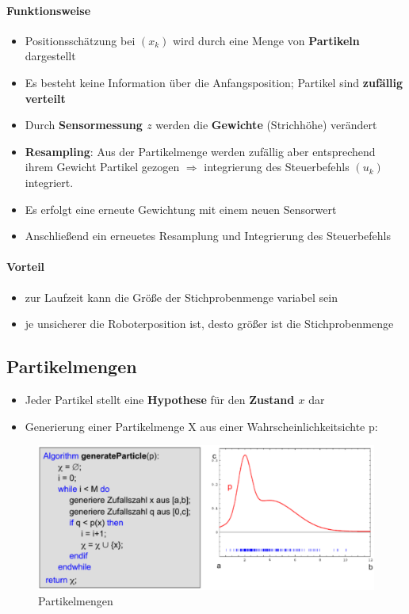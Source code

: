 \paragraph{Funktionsweise}
\begin{itemize}
	\item Positionsschätzung bei $(x_k)$ wird durch eine Menge von \textbf{Partikeln} dargestellt
	\item Es besteht keine Information über die Anfangsposition; Partikel sind \textbf{zufällig verteilt}
	\item Durch \textbf{Sensormessung $z$} werden die \textbf{Gewichte} (Strichhöhe) verändert
	\item \textbf{Resampling}: Aus der Partikelmenge werden zufällig aber entsprechend ihrem Gewicht Partikel gezogen $\Rightarrow$ integrierung des Steuerbefehls $(u_k)$ integriert.
	\item Es erfolgt eine erneute Gewichtung mit einem neuen Sensorwert
	\item Anschließend ein erneuetes Resamplung und Integrierung des Steuerbefehls
\end{itemize}
\paragraph{Vorteil}
\begin{itemize}
	\item zur Laufzeit kann die Größe der Stichprobenmenge variabel sein
	\item je unsicherer die Roboterposition ist, desto größer ist die Stichprobenmenge
\end{itemize}
\subsection{Partikelmengen}
\begin{itemize}
	\item Jeder Partikel stellt eine \textbf{Hypothese} für den \textbf{Zustand $x$} dar
	\item Generierung einer Partikelmenge X aus einer Wahrscheinlichkeitsichte p:
\end{itemize}
\begin{figure}[H]
	\begin{center}
		\includegraphics[scale=0.5]{Resources/PNG/PartikelMengen.PNG}
		\caption{Partikelmengen}
		\label{fig:PNG/PartikelMengen.PNG}
	\end{center}
\end{figure}

